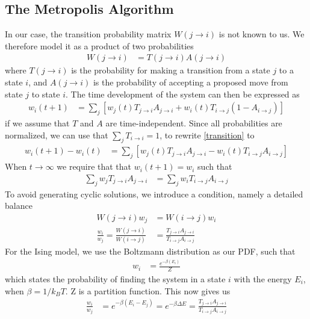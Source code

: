 \subsection{The Metropolis Algorithm}
In our case, the transition probability matrix $W(j\rightarrow i)$ is not known to us. We therefore model it as a product of two probabilities
\begin{align}
    W(j\rightarrow i) &= T(j\rightarrow i)A(j\rightarrow i)
\end{align}
where $T(j\rightarrow i)$ is the probability for making a transition from a state $j$ to a state $i$, and $A(j\rightarrow i)$ is the probability of accepting a proposed move from state $j$ to state $i$. The time development of the system can then be expressed as
\begin{align}
    w_i(t+1) &= \sum_j\left[w_j(t)T_{j\rightarrow i}A_{j\rightarrow i} + w_i(t)T_{i\rightarrow j}(1-A_{i\rightarrow j})\right]\label{transition}
\end{align}
if we assume that $T$ and $A$ are time-independent. Since all probabilities are normalized, we can use that $\sum_jT_{i\rightarrow i} = 1$, to rewrite \eqref{transition} to
\begin{align}
    w_i(t+1) - w_i(t) &= \sum_j\left[w_j(t)T_{j\rightarrow i}A_{j\rightarrow i} - w_i(t)T_{i\rightarrow j}A_{i\rightarrow j}\right]
\end{align}
When $t\rightarrow \infty$ we require that that $w_i(t+1) = w_i$ such that
\begin{align}
    \sum_jw_jT_{j\rightarrow i}A_{j\rightarrow i} &= \sum_jw_iT_{i\rightarrow j}A_{i\rightarrow j}
\end{align}
To avoid generating cyclic solutions, we introduce a condition, namely a detailed balance
\begin{align}
    W(j\rightarrow i)w_j &= W(i\rightarrow j)w_i\\
    \frac{w_i}{w_j} = \frac{W(j\rightarrow i)}{W(i\rightarrow j)} &= \frac{T_{j\rightarrow i}A_{j\rightarrow i}}{T_{i\rightarrow j}A_{i\rightarrow j}}
\end{align}
For the Ising model, we use the Boltzmann distribution as our PDF, such that
\begin{align}
    w_i &= \frac{e^{-\beta(E_i)}}{Z}
\end{align}
which states the probability of finding the system in a state $i$ with the energy $E_i$, when $\beta = 1/k_BT$. Z is a partition function. This now gives us
\begin{align}
    \frac{w_i}{w_j} &= e^{-\beta(E_i - E_j)} = e^{-\beta\Delta E} = \frac{T_{j\rightarrow i}A_{j\rightarrow i}}{T_{i\rightarrow j}A_{i\rightarrow j}}
\end{align}
